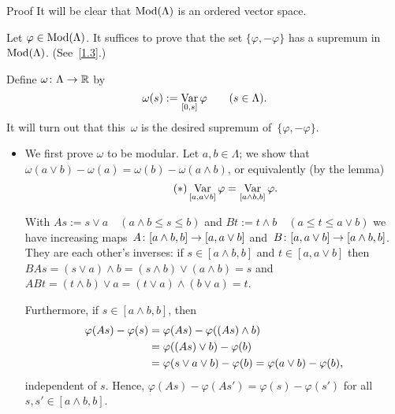 \documentclass[main.tex]{subfiles}
\begin{document}
\begin{psec*}{Proof}
It will be clear that $\mathrm{Mod}(\Lambda)$ is an ordered vector space.

Let $\varphi\in\mathrm{Mod}(\Lambda)$. 
It suffices to prove that the set $\{\varphi,-\varphi\}$
has a supremum in~$\mathrm{Mod}(\Lambda)$. (See~\ref{1.3}.)

Define $\omega\colon\Lambda \rightarrow \mathbb{R}$ by
\begin{equation*}
\omega(s) := \mathop{\mathrm{Var}}_{[0,s]}\varphi \qquad (s\in \Lambda)\textnormal{.}
\end{equation*}
It will turn out that this~$\omega$ 
is the desired supremum of~$\{\varphi,-\varphi\}$.
\begin{itemize}
\item 
We first prove $\omega$ to be modular.
Let $a,b\in \Lambda$; we show that
$\omega(a\vee b) - \omega(a) = \omega(b) - \omega(a\wedge b)$,
or equivalently (by the lemma)
\begin{equation}
\label{eq1.10_1}  \tag{$*$}
\mathop{\mathrm{Var}}_{[a,a\vee b]}\varphi = \mathop{\mathrm{Var}}_{[a\wedge b,b]}\varphi 
\textnormal{.}
\end{equation}

With $As := s\vee a \quad (a\wedge b\leq s\leq b)$
and $Bt := t\wedge b \quad (a\leq t \leq a\vee b)$
we have increasing maps~$A\colon [a\wedge b,b]\rightarrow [a,a\vee b]$
and~$B\colon [a,a\vee b]\rightarrow[a\wedge b,b]$.
They are each other's inverses: 
if $s\in[a\wedge b, b]$ and $t\in [a,a\vee b]$
then~$BAs = (s\vee a)\wedge b = (s\wedge b) \vee (a\wedge b) = s$ 
and~$ABt = (t\wedge b)\vee a = (t\vee a)\wedge(b\vee a) = t$.

Furthermore, if $s\in [a\wedge b, b]$, then
\begin{align*}
\varphi(As) - \varphi(s) 
  & = \varphi(As) - \varphi ((As)\wedge b) \\
  & = \varphi((As)\vee b) - \varphi(b) \\
  & = \varphi(s\vee a\vee b)-\varphi(b) = \varphi(a\vee b)-\varphi(b)
\textnormal{,}
\end{align*}
independent of $s$.
Hence, $\varphi(As)-\varphi(As')=\varphi(s)-\varphi(s')$
for all $s,s'\in[a\wedge b,b]$.


\end{itemize}
\end{psec*}
\end{document}
